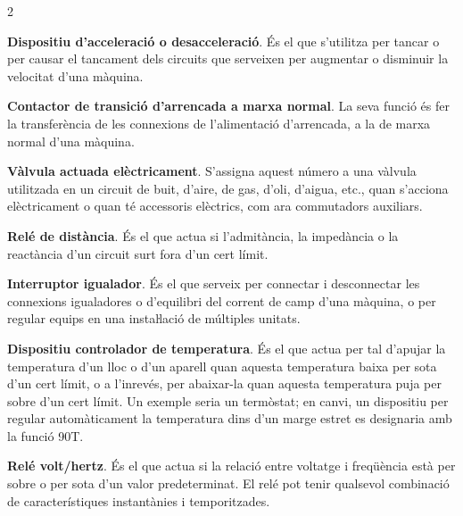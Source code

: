 \begin{multicols}{2}
\begin{list}{}
		\item[\textbf{18}]  
		\textbf{Dispositiu d'acceleració o desacceleració}. És
		el que s'utilitza per tancar o per causar el tancament dels circuits
		que serveixen per augmentar o disminuir la velocitat d'una màquina.
		
		\item[\textbf{19}]  
		\textbf{Contactor de transició d'arrencada a marxa normal}. La seva
		funció és fer la transferència de les connexions de l'alimentació
		d'arrencada, a la de marxa normal d'una màquina.
		
		\item[\textbf{20}]  
		\textbf{Vàlvula actuada elèctricament}. S'assigna aquest número a una vàlvula
		utilitzada en un circuit de buit, d'aire, de gas, d'oli, d'aigua,
		etc., quan s'acciona elèctricament o quan té accessoris elèctrics,
		com ara commutadors auxiliars.
		
		\item[\textbf{21}]   
		\textbf{Relé de distància}. És el que actua
		si l'admitància, la impedància o la reactància d'un circuit surt fora d'un cert límit.
		
		\item[\textbf{22}]   
		\textbf{Interruptor igualador}.  És el
		que serveix per connectar i desconnectar les connexions igualadores
		o d'equilibri del corrent de camp d'una màquina, o per regular
		equips en una  instaŀlació de  múltiples unitats.
		
		\item[\textbf{23}]   
		\textbf{Dispositiu controlador de temperatura}. És el que actua per tal d'apujar la
		temperatura d'un lloc o d'un aparell quan aquesta temperatura baixa
		per sota d'un cert límit, o a l'inrevés, per abaixar-la quan aquesta
		temperatura  puja per sobre d'un cert límit. Un exemple seria un
		termòstat; en canvi, un dispositiu per regular automàticament la temperatura dins
		d'un marge estret es designaria amb la funció 90T.
		
		\item[\textbf{24}]  
		\textbf{Relé volt/hertz}.
		És el que actua si la relació  entre voltatge i freqüència està per sobre o  per sota d'un valor predeterminat. El relé pot tenir qualsevol combinació de característiques instantànies i temporitzades.
		

\end{list}
\end{multicols}

